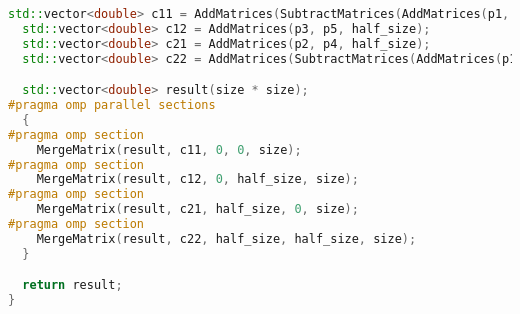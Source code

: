 \documentclass[14pt,a4paper]{extarticle}
\begin{document}
\begin{lstlisting}[language=C++]
  std::vector<double> c11 = AddMatrices(SubtractMatrices(AddMatrices(p1, p4, half_size), p5, half_size), p7, half_size);
  std::vector<double> c12 = AddMatrices(p3, p5, half_size);
  std::vector<double> c21 = AddMatrices(p2, p4, half_size);
  std::vector<double> c22 = AddMatrices(SubtractMatrices(AddMatrices(p1, p3, half_size), p2, half_size), p6, half_size);

  std::vector<double> result(size * size);
#pragma omp parallel sections
  {
#pragma omp section
    MergeMatrix(result, c11, 0, 0, size);
#pragma omp section
    MergeMatrix(result, c12, 0, half_size, size);
#pragma omp section
    MergeMatrix(result, c21, half_size, 0, size);
#pragma omp section
    MergeMatrix(result, c22, half_size, half_size, size);
  }

  return result;
}
\end{lstlisting}
\end{document}
